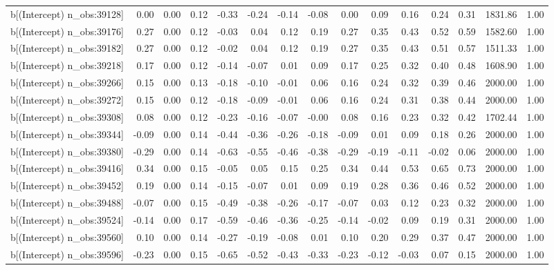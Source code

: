 \begin{table}[ht]
\begin{tabular}{rrrrrrrrrrrrrrr}
  b[(Intercept) n\_obs:39128] & 0.00 & 0.00 & 0.12 & -0.33 & -0.24 & -0.14 & -0.08 & 0.00 & 0.09 & 0.16 & 0.24 & 0.31 & 1831.86 & 1.00 \\ 
  b[(Intercept) n\_obs:39176] & 0.27 & 0.00 & 0.12 & -0.03 & 0.04 & 0.12 & 0.19 & 0.27 & 0.35 & 0.43 & 0.52 & 0.59 & 1582.60 & 1.00 \\ 
  b[(Intercept) n\_obs:39182] & 0.27 & 0.00 & 0.12 & -0.02 & 0.04 & 0.12 & 0.19 & 0.27 & 0.35 & 0.43 & 0.51 & 0.57 & 1511.33 & 1.00 \\ 
  b[(Intercept) n\_obs:39218] & 0.17 & 0.00 & 0.12 & -0.14 & -0.07 & 0.01 & 0.09 & 0.17 & 0.25 & 0.32 & 0.40 & 0.48 & 1608.90 & 1.00 \\ 
  b[(Intercept) n\_obs:39266] & 0.15 & 0.00 & 0.13 & -0.18 & -0.10 & -0.01 & 0.06 & 0.16 & 0.24 & 0.32 & 0.39 & 0.46 & 2000.00 & 1.00 \\ 
  b[(Intercept) n\_obs:39272] & 0.15 & 0.00 & 0.12 & -0.18 & -0.09 & -0.01 & 0.06 & 0.16 & 0.24 & 0.31 & 0.38 & 0.44 & 2000.00 & 1.00 \\ 
  b[(Intercept) n\_obs:39308] & 0.08 & 0.00 & 0.12 & -0.23 & -0.16 & -0.07 & -0.00 & 0.08 & 0.16 & 0.23 & 0.32 & 0.42 & 1702.44 & 1.00 \\ 
  b[(Intercept) n\_obs:39344] & -0.09 & 0.00 & 0.14 & -0.44 & -0.36 & -0.26 & -0.18 & -0.09 & 0.01 & 0.09 & 0.18 & 0.26 & 2000.00 & 1.00 \\ 
  b[(Intercept) n\_obs:39380] & -0.29 & 0.00 & 0.14 & -0.63 & -0.55 & -0.46 & -0.38 & -0.29 & -0.19 & -0.11 & -0.02 & 0.06 & 2000.00 & 1.00 \\ 
  b[(Intercept) n\_obs:39416] & 0.34 & 0.00 & 0.15 & -0.05 & 0.05 & 0.15 & 0.25 & 0.34 & 0.44 & 0.53 & 0.65 & 0.73 & 2000.00 & 1.00 \\ 
  b[(Intercept) n\_obs:39452] & 0.19 & 0.00 & 0.14 & -0.15 & -0.07 & 0.01 & 0.09 & 0.19 & 0.28 & 0.36 & 0.46 & 0.52 & 2000.00 & 1.00 \\ 
  b[(Intercept) n\_obs:39488] & -0.07 & 0.00 & 0.15 & -0.49 & -0.38 & -0.26 & -0.17 & -0.07 & 0.03 & 0.12 & 0.23 & 0.32 & 2000.00 & 1.00 \\ 
  b[(Intercept) n\_obs:39524] & -0.14 & 0.00 & 0.17 & -0.59 & -0.46 & -0.36 & -0.25 & -0.14 & -0.02 & 0.09 & 0.19 & 0.31 & 2000.00 & 1.00 \\ 
  b[(Intercept) n\_obs:39560] & 0.10 & 0.00 & 0.14 & -0.27 & -0.19 & -0.08 & 0.01 & 0.10 & 0.20 & 0.29 & 0.37 & 0.47 & 2000.00 & 1.00 \\ 
  b[(Intercept) n\_obs:39596] & -0.23 & 0.00 & 0.15 & -0.65 & -0.52 & -0.43 & -0.33 & -0.23 & -0.12 & -0.03 & 0.07 & 0.15 & 2000.00 & 1.00 \\ 

\end{tabular}
\end{table}

